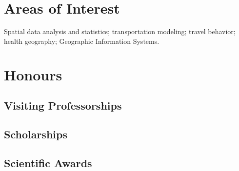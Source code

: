 \documentclass[11pt,a4paper,]{awesome-cv}
\begin{document}
\newpage

\hypertarget{areas-of-interest}{%
\section{Areas of Interest}\label{areas-of-interest}}

Spatial data analysis and statistics; transportation modeling; travel
behavior; health geography; Geographic Information Systems.

\hypertarget{honours}{%
\section{Honours}\label{honours}}

\hypertarget{visiting-professorships}{%
\subsection{Visiting Professorships}\label{visiting-professorships}}

\begin{cventries}
    \vspace{-4.0mm}
\end{cventries}

\hypertarget{scholarships}{%
\subsection{Scholarships}\label{scholarships}}

\begin{cventries}
    \vspace{-4.0mm}
    \vspace{-4.0mm}
\end{cventries}

\hypertarget{scientific-awards}{%
\subsection{Scientific Awards}\label{scientific-awards}}
\end{document}

